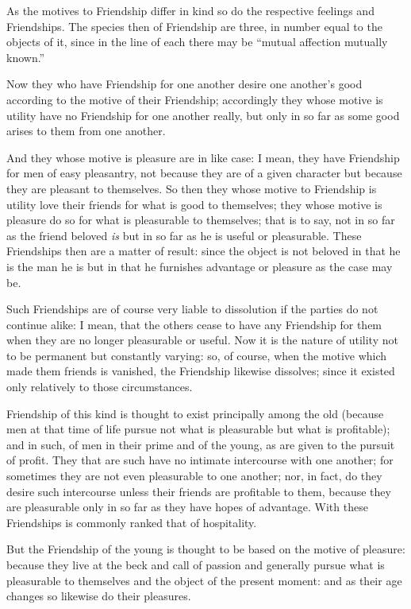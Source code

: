 
As the motives to Friendship differ in kind so do the respective feelings and
Friendships. The species then of Friendship are three, in number equal to the
objects of it, since in the line of each there may be “mutual affection
mutually known.”

Now they who have Friendship for one another desire one another’s good
according to the motive of their Friendship; accordingly they whose motive is
utility have no Friendship for one another really, but only in so far as some
good arises to them from one another.

And they whose motive is pleasure are in like case: I mean, they have
Friendship for men of easy pleasantry, not because they are of a given
character but because they are pleasant to themselves. So then they whose
motive to Friendship is utility love their friends for what is good to
themselves; they whose motive is pleasure do so for what is pleasurable to
themselves; that is to say, not in so far as the friend beloved \emph{is} but
in so far as he is useful or pleasurable. These Friendships then are a matter
of result: since the object is not beloved in that he is the man he is but in
that he furnishes advantage or pleasure as the case may be.

Such Friendships are of course very liable to dissolution if the parties do not
continue alike: I mean, that the others cease to have any Friendship for them
when they are no longer pleasurable or useful. Now it is the nature of utility
not to be permanent but constantly varying: so, of course, when the motive
which made them friends is vanished, the Friendship likewise dissolves; since
it existed only relatively to those circumstances.

Friendship of this kind is thought to exist principally among the old (because
men at that time of life pursue not what is pleasurable but what is
profitable); and in such, of men in their prime and of the young, as are given
to the pursuit of profit. They that are such have no intimate intercourse with
one another; for sometimes they are not even pleasurable to one another; nor,
in fact, do they desire such intercourse unless their friends are profitable to
them, because they are pleasurable only in so far as they have hopes of
advantage. With these Friendships is commonly ranked that of hospitality.

But the Friendship of the young is thought to be based on the motive of
pleasure: because they live at the beck and call of passion and generally
pursue what is pleasurable to themselves and the object of the present moment:
and as their age changes so likewise do their pleasures.

